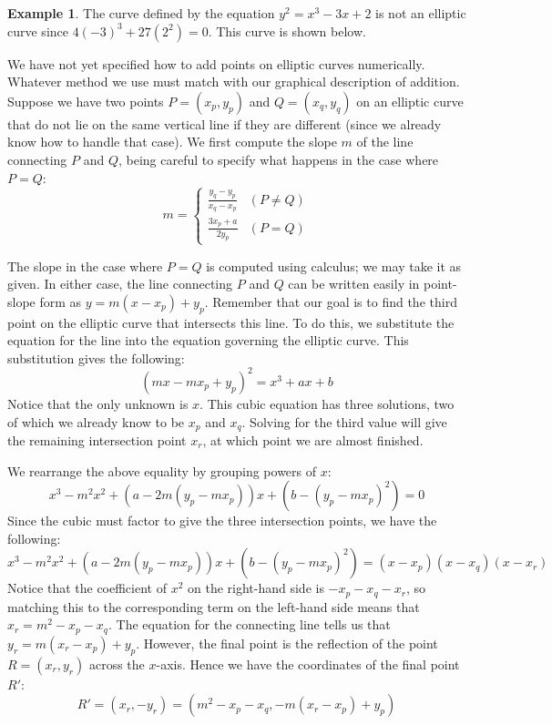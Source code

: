 \documentclass{book}
\theoremstyle{plain}
\theoremstyle{definition}
\newtheorem{example}[theorem]{Example}
\begin{document}
\begin{example}
The curve defined by the equation $y^2 = x^3 - 3x + 2$ is not an elliptic curve since $4(-3)^3 + 27(2^2) = 0$. This curve is shown below.

\begin{center}
\end{center}
\end{example}

We have not yet specified how to add points on elliptic curves numerically. Whatever method we use must match with our graphical description of addition. Suppose we have two points $P = (x_p,y_p)$ and $Q = (x_q,y_q)$ on an elliptic curve that do not lie on the same vertical line if they are different (since we already know how to handle that case). We first compute the slope $m$ of the line connecting $P$ and $Q$, being careful to specify what happens in the case where $P = Q$:
\begin{equation*}
m = \left\{\begin{array}{ll}
\frac{y_q-y_p}{x_q-x_p} & (P \neq Q) \\
\frac{3x_p+a}{2y_p} & (P = Q)
\end{array}\right.
\end{equation*}

The slope in the case where $P = Q$ is computed using calculus; we may take it as given. In either case, the line connecting $P$ and $Q$ can be written easily in point-slope form as $y = m(x-x_p) + y_p$. Remember that our goal is to find the third point on the elliptic curve that intersects this line. To do this, we substitute the equation for the line into the equation governing the elliptic curve. This substitution gives the following:
$$(mx-mx_p+y_p)^2 = x^3 + ax + b$$
Notice that the only unknown is $x$. This cubic equation has three solutions, two of which we already know to be $x_p$ and $x_q$. Solving for the third value will give the remaining intersection point $x_r$, at which point we are almost finished.

We rearrange the above equality by grouping powers of $x$:
$$x^3-m^2x^2+(a-2m(y_p-mx_p))x+(b-(y_p-mx_p)^2)=0$$
Since the cubic must factor to give the three intersection points, we have the following:
$$x^3-m^2x^2+(a-2m(y_p-mx_p))x+(b-(y_p-mx_p)^2)=(x-x_p)(x-x_q)(x-x_r)$$
Notice that the coefficient of $x^2$ on the right-hand side is $-x_p-x_q-x_r$, so matching this to the corresponding term on the left-hand side means that $x_r=m^2-x_p-x_q$. The equation for the connecting line tells us that $y_r=m(x_r-x_p)+y_p$. However, the final point is the reflection of the point $R=(x_r,y_r)$ across the $x$-axis. Hence we have the coordinates of the final point $R'$:
$$R' = (x_r,-y_r) = (m^2-x_p-x_q,-m(x_r-x_p)+y_p)$$
\end{document}
